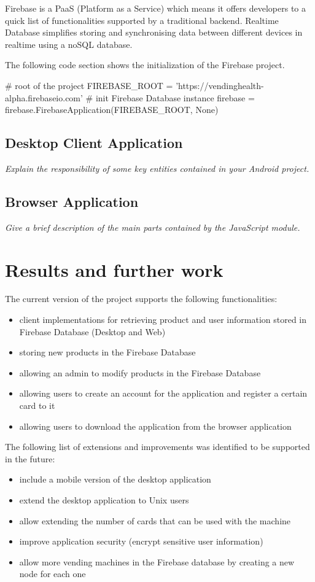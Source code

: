 \documentclass[a4paper,11pt]{article}
\begin{document}
Firebase is a PaaS (Platform as a Service) which means it offers developers to a quick list of functionalities supported by a traditional backend.
Realtime Database simplifies storing and synchronising data between different devices in realtime using a noSQL database.

The following code section shows the initialization of the Firebase project.\\

\begin{python}
# root of the project
FIREBASE_ROOT = 'https://vendinghealth-alpha.firebaseio.com'
# init Firebase Database instance
firebase = firebase.FirebaseApplication(FIREBASE_ROOT, None)
\end{python}

\subsection{Desktop Client Application}
\textit{Explain the responsibility of some key entities contained in your Android project.}

\subsection{Browser Application}
\textit{Give a brief description of the main parts contained by the JavaScript module.}

\section{Results and further work}

The current version of the project supports the following functionalities:
\begin{itemize}
\item client implementations for retrieving product and user information stored in Firebase Database (Desktop and Web)
\item storing new products in the Firebase Database
\item allowing an admin to modify products in the Firebase Database
\item allowing users to create an account for the application and register a certain card to it
\item allowing users to download the application from the browser application\\
\end{itemize}

The following list of extensions and improvements was identified to be supported in the future:
\begin{itemize}
\item include a mobile version of the desktop application
\item extend the desktop application to Unix users
\item allow extending the number of cards that can be used with the machine 
\item improve application security (encrypt sensitive user information)
\item allow more vending machines in the Firebase database by creating a new node for each one
\end{itemize}
\end{document}
